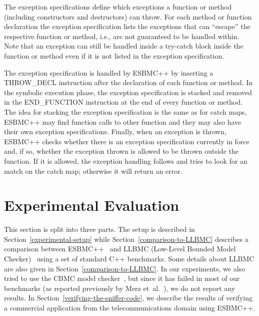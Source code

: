 \documentclass[conference]{IEEEtran}
\begin{document}
The exception specifications define which exceptions a
function or method (including constructors
and destructors) can throw.
For each method or function declaration the exception
specification lists the exceptions that can ``escape'' the
respective function or method, i.e., are not guaranteed to be
handled within.
Note that an exception can still be handled inside
a try-catch block inside the function or method
even if it is not listed in the exception specification.

The exception specification is handled by ESBMC++
by inserting a THROW\_DECL instruction after the declaration
of each function or method. In the symbolic execution phase,
the exception specification is stacked and removed in the
END\_FUNCTION instruction at the end of every
function or method. The idea for stacking the exception
specification is the same as for catch maps, ESBMC++ may
find function calls to other
function and they may also have their own exception specifications.
Finally, when an exception is thrown, ESBMC++ checks whether there is an
exception specification currently in force and, if so, whether the exception thrown
is allowed to be thrown outside the function. If it is allowed, the
exception handling follows and tries to look for an match on the catch
map; otherwise it will return an error.


\section{Experimental Evaluation}
\label{experimental-results}

This section is split into three parts.
The setup is described in Section~\ref{experimental-setup}
while Section~\ref{comparison-to-LLBMC} describes a comparison
between ESBMC++~\cite{esbmc12} and
LLBMC (Low-Level Bounded Model Checker)~\cite{llbmc12}
using a set of standard C++ benchmarks. Some details about LLBMC
are also given in Section~\ref{comparison-to-LLBMC}.
In our experiments, we also tried to use the CBMC model checker~\cite{Clarke04},
but since it has failed in most of our benchmarks (as reported previously
by Merz et~al.~\cite{Florian12}), we do not report any results.
In Section~\ref{verifying-the-sniffer-code}, we describe the results of
verifying a commercial application from the telecommunications domain using ESBMC++.
\end{document}
